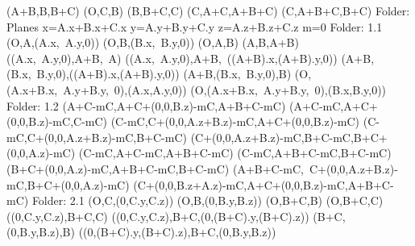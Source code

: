 \left(A+B,B,B+C\right)
\left(O,C,B\right)
\left(B,B+C,C\right)
\left(C,A+C,A+B+C\right)
\left(C,A+B+C,B+C\right)
Folder: Planes
x=A.x+B.x+C.x
y=A.y+B.y+C.y
z=A.z+B.z+C.z
m=0
Folder: 1.1
\left(O,A,\left(A.x,\ A.y,0\right)\right)
\left(O,B,\left(B.x,\ B.y,0\right)\right)
\left(O,A,B\right)
\left(A,B,A+B\right)
\left(\left(A.x,\ A.y,0\right),A+B,\ A\right)
\left(\left(A.x,\ A.y,0\right),A+B,\ \left(\left(A+B\right).x,\left(A+B\right).y,0\right)\right)
\left(A+B,\left(B.x,\ B.y,0\right),\left(\left(A+B\right).x,\left(A+B\right).y,0\right)\right)
\left(A+B,\left(B.x,\ B.y,0\right),B\right)
\left(O,\left(A.x+B.x,\ A.y+B.y,\ 0\right),\left(A.x,A.y,0\right)\right)
\left(O,\left(A.x+B.x,\ A.y+B.y,\ 0\right),\left(B.x,B.y,0\right)\right)
Folder: 1.2
\left(A+C-mC,A+C+\left(0,0,B.z\right)-mC,A+B+C-mC\right)
\left(A+C-mC,A+C+\left(0,0,B.z\right)-mC,C-mC\right)
\left(C-mC,C+\left(0,0,A.z+B.z\right)-mC,A+C+\left(0,0,B.z\right)-mC\right)
\left(C-mC,C+\left(0,0,A.z+B.z\right)-mC,B+C-mC\right)
\left(C+\left(0,0,A.z+B.z\right)-mC,B+C-mC,B+C+\left(0,0,A.z\right)-mC\right)
\left(C-mC,A+C-mC,A+B+C-mC\right)
\left(C-mC,A+B+C-mC,B+C-mC\right)
\left(B+C+\left(0,0,A.z\right)-mC,A+B+C-mC,B+C-mC\right)
\left(A+B+C-mC,\ C+\left(0,0,A.z+B.z\right)-mC,B+C+\left(0,0,A.z\right)-mC\right)
\left(C+\left(0,0,B.z+A.z\right)-mC,A+C+\left(0,0,B.z\right)-mC,A+B+C-mC\right)
Folder: 2.1
\left(O,C,\left(0,C.y,C.z\right)\right)
\left(O,B,\left(0,B.y,B.z\right)\right)
\left(O,B+C,B\right)
\left(O,B+C,C\right)
\left(\left(0,C.y,C.z\right),B+C,C\right)
\left(\left(0,C.y,C.z\right),B+C,\left(0,\left(B+C\right).y,\left(B+C\right).z\right)\right)
\left(B+C,\left(0,B.y,B.z\right),B\right)
\left(\left(0,\left(B+C\right).y,\left(B+C\right).z\right),B+C,\left(0,B.y,B.z\right)\right)
